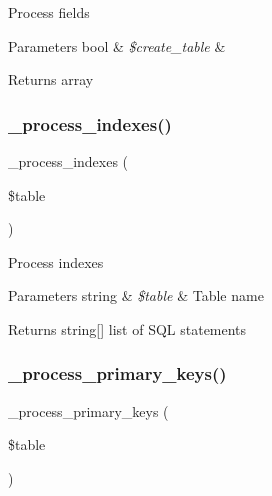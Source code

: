 Process fields


\begin{DoxyParams}[1]{Parameters}
bool & {\em \$create\+\_\+table} & \\
\hline
\end{DoxyParams}
\begin{DoxyReturn}{Returns}
array 
\end{DoxyReturn}
\mbox{\label{class_c_i___d_b__forge_ae0bdb4ea3418590d1894c5b621b5ca50}} 
\subsubsection{\texorpdfstring{\+\_\+process\+\_\+indexes()}{\_process\_indexes()}}
{\footnotesize\ttfamily \+\_\+process\+\_\+indexes (\begin{DoxyParamCaption}\item[{}]{\$table }\end{DoxyParamCaption})\hspace{0.3cm}{\ttfamily [protected]}}

Process indexes


\begin{DoxyParams}[1]{Parameters}
string & {\em \$table} & Table name \\
\hline
\end{DoxyParams}
\begin{DoxyReturn}{Returns}
string\mbox{[}\mbox{]} list of S\+QL statements 
\end{DoxyReturn}
\mbox{\label{class_c_i___d_b__forge_a207c32e2b5c14364b2e33d2f15500b7e}} 
\subsubsection{\texorpdfstring{\+\_\+process\+\_\+primary\+\_\+keys()}{\_process\_primary\_keys()}}
{\footnotesize\ttfamily \+\_\+process\+\_\+primary\+\_\+keys (\begin{DoxyParamCaption}\item[{}]{\$table }\end{DoxyParamCaption})\hspace{0.3cm}{\ttfamily [protected]}}


